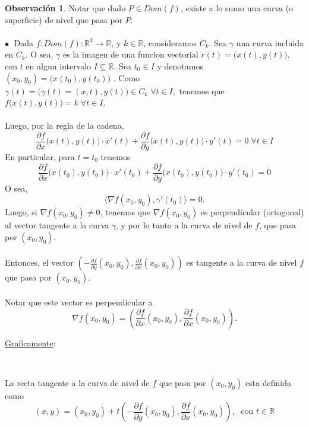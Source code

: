 \documentclass{article}
\theoremstyle{definition}
\newtheorem*{obs}{Observación}
\theoremstyle{remark}
\newcommand\bl{$\bullet\;$}
\begin{document}
\begin{obs}
  Notar que dado $P \in Dom(f)$, existe a lo sumo una curva (o superficie) de nivel que pasa por $P$. \\\\
  \textcolor{rojop2}{\bl} Dada $f: Dom(f) : \mathbb{R}^2 \to \mathbb{R}$, y $k \in \mathbb{R}$, consideramos $C_k$. Sea $\gamma$ una curva incluida en $C_k$. O sea, $\gamma$ es la imagen de una funcion vectorial $r(t)=\big(x(t),y(t))$, con $t$ en algun intervalo $I \subseteq \mathbb{R}$. Sea $t_0 \in I$ y denotamos $(x_0,y_0)=\big(x(t_0),y(t_0)\big)$
    . Como $\gamma(t)=\big(\gamma(t)=(x,t),y(t)\big) \in C_k \; \forall t \in I,$ tenemos que $f\big(x(t),y(t)\big)=k \; \forall t \in I$.\\\\Luego, por la regla de la cadena, \[
      \frac{\partial f}{\partial x}\big(x(t),y(t)\big) \cdot x'(t) + \frac{\partial f}{\partial y} \big(x(t),y(t)\big) \cdot y'(t) = 0\; \forall t \in I 
    \]
    En particular, para $t=t_0$ tenemos \[
      \frac{\partial f}{\partial x}\big(x(t_0),y(t_0)\big) \cdot x'(t_0) + \frac{\partial f}{\partial y} \big(x(t_0),y(t_0)\big) \cdot y'(t_0) = 0 
    \]
    O sea, \[
\big\langle \nabla f(x_0,y_0),\gamma'(t_0) \big\rangle =0.
\]Luego, si $\nabla f(x_0,y_0)\neq0$, tenemos que $\nabla f(x_0,y_0)$ es perpendicular (ortogonal) al vector tangente a la curva $\gamma$, y por lo tanto a la curva de nivel de $f$, que pasa por $(x_0,y_0)$.\\\\ Entonces, el vector $\left(-\frac{\partial f}{\partial y}(x_0,y_0),\frac{\partial f}{\partial x}(x_0,y_0)\right)$ es tangente a la curva de nivel $f$ que pasa por $(x_0,y_0)$. \\\\ Notar que este vector es perpendicular a $$ \nabla f(x_0,y_0)=\left(\frac{\partial f}{\partial x}(x_0,y_0),\frac{\partial f}{\partial x}(x_0,y_0)\right).$$
  \end{obs}\pagebreak
  \underline{Graficamente}:
  \begin{figure}[h]
\centering
\def\svgwidth{0.75\textwidth}
\makebox[\textwidth]{
}
\end{figure} \\ \pagebreak
\begin{defi}
  La recta tangente a la curva de nivel de $f$ que pasa por $(x_0,y_0)$ esta definida como \[
    (x,y)=(x_0,y_0)+t\left(-\frac{\partial f}{\partial y}(x_0,y_0),\frac{\partial f}{\partial x}(x_0,y_0)\right),\;\text{ con } t \in \mathbb{R}
  \]
\end{defi}
\end{document}
